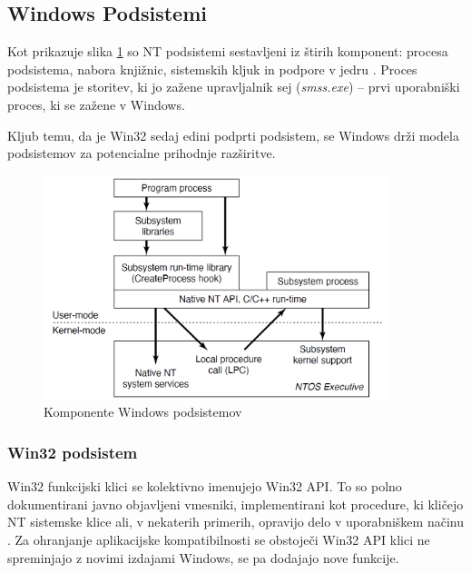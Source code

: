 \documentclass[a4paper,12pt,openright]{book}
\begin{document}
\subsection{Windows Podsistemi}

Kot prikazuje slika \ref{fig:windows_subsystems_components} so NT podsistemi sestavljeni iz štirih komponent: procesa podsistema, nabora knjižnic, sistemskih kljuk in podpore v jedru \cite{Tanenbaum_Bos_2023}.
Proces podsistema je storitev, ki jo zažene upravljalnik sej (\textit{smss.exe}) -- prvi uporabniški proces, ki se zažene v Windows.

Kljub temu, da je Win32 sedaj edini podprti podsistem, se Windows drži modela podsistemov za potencialne prihodnje razširitve.

\begin{figure}[h!]
	\begin{center}
		\includegraphics[width=0.9\textwidth]{images/windows_subsystems_components.png}
	\end{center}
	\caption{Komponente Windows podsistemov \cite{Tanenbaum_Bos_2023}}
	\label{fig:windows_subsystems_components}
\end{figure}

\subsubsection{Win32 podsistem}

Win32 funkcijski klici se kolektivno imenujejo Win32 API.
To so polno dokumentirani javno objavljeni vmesniki, implementirani kot procedure, ki kličejo NT sistemske klice ali, v nekaterih primerih, opravijo delo v uporabniškem načinu \cite{Tanenbaum_Bos_2023}.
Za ohranjanje aplikacijske kompatibilnosti se obstoječi Win32 API klici ne spreminjajo z novimi izdajami Windows, se pa dodajajo nove funkcije.
\end{document}
